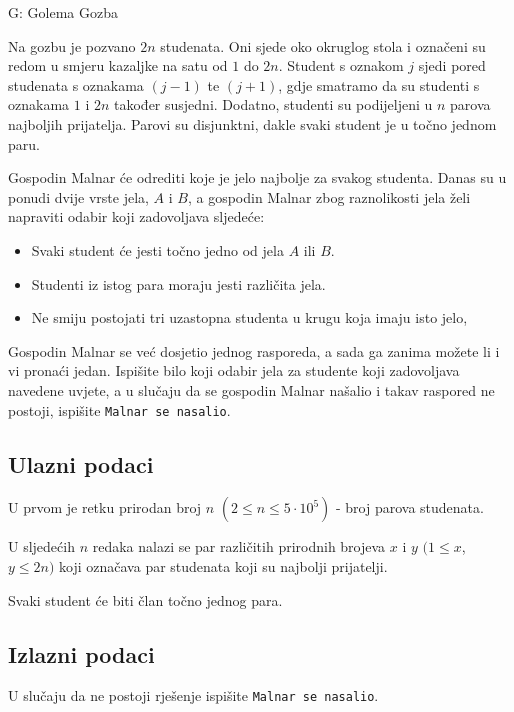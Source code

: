 \begin{statement}[
  timelimit=1 s,
  memorylimit=512 MiB,
]{G: Golema Gozba}

Na gozbu je pozvano $2n$ studenata. Oni sjede oko okruglog stola i označeni su
redom u smjeru kazaljke na satu od $1$ do $2n$. Student s oznakom $j$ sjedi
pored studenata s oznakama $(j - 1)$ te $(j + 1)$, gdje smatramo da su studenti
s oznakama $1$ i $2n$ također susjedni. Dodatno, studenti su podijeljeni u $n$
parova najboljih prijatelja. Parovi su disjunktni, dakle svaki student je u
točno jednom paru.

Gospodin Malnar će odrediti koje je jelo najbolje za svakog studenta. Danas su
u ponudi dvije vrste jela, $A$ i $B$, a gospodin Malnar zbog raznolikosti jela
želi napraviti odabir koji zadovoljava sljedeće:
\begin{itemize}
    \item Svaki student će jesti točno jedno od jela $A$ ili $B$.
    \item Studenti iz istog para moraju jesti različita jela.
    \item Ne smiju postojati tri uzastopna studenta u krugu koja imaju isto jelo,
\end{itemize}

Gospodin Malnar se već dosjetio jednog rasporeda, a sada ga zanima možete li i
vi pronaći jedan. Ispišite bilo koji odabir jela za studente koji zadovoljava
navedene uvjete, a u slučaju da se gospodin Malnar našalio i takav raspored ne
postoji, ispišite \texttt{Malnar se nasalio}.

\subsection*{Ulazni podaci}
U prvom je retku prirodan broj $n$ $(2 \le n \le 5 \cdot 10^5)$ - broj parova
studenata.

U sljedećih $n$ redaka nalazi se par različitih prirodnih brojeva $x$ i $y$
$(1 \le x$, $y \le 2n)$ koji označava par studenata koji su najbolji prijatelji.

Svaki student će biti član točno jednog para.
\subsection*{Izlazni podaci}
U slučaju da ne postoji rješenje ispišite \texttt{Malnar se nasalio}.


\end{statement}
